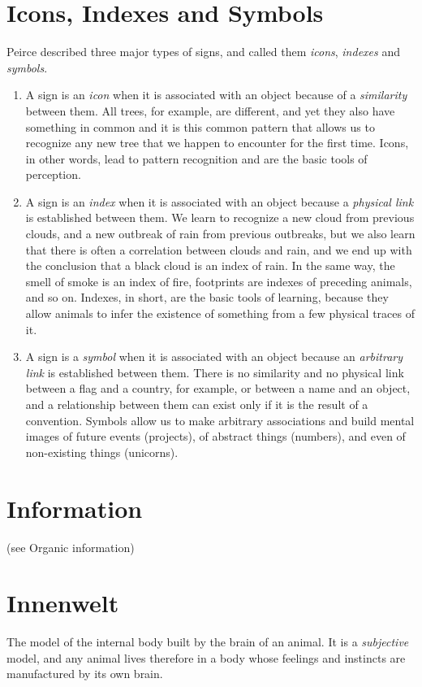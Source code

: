 \documentclass[12pt]{article}
\begin{document}
\section{Icons, Indexes and Symbols}
Peirce described three major types of signs, and called them \textit{icons}, \textit{indexes} and \textit{symbols}.
\begin{enumerate}
\item A sign is an \textit{icon} when it is associated with an object because of a \textit{similarity} between them. All trees, for example, are different, and yet they also have something in common and it is this common pattern that allows us to recognize any new tree that we happen to encounter for the first time. Icons, in other words, lead to pattern recognition and are the basic tools of perception. 

\item A sign is an \textit{index} when it is associated with an object because a \textit{physical link} is established between them. We learn to recognize a new cloud from previous clouds, and a new outbreak of rain from previous outbreaks, but we also learn that there is often a correlation between clouds and rain, and we end up with the conclusion that a black cloud is an index of rain. In the same way, the smell of smoke is an index of fire, footprints are indexes of preceding animals, and so on. Indexes, in short, are the basic tools of learning, because they allow animals to infer the existence of something from a few physical traces of it.

\item A sign is a \textit{symbol} when it is associated with an object because an \textit{arbitrary link} is established between them. There is no similarity and no physical link between a flag and a country, for example, or between a name and an object, and a relationship between them can exist only if it is the result of a convention. Symbols allow us to make arbitrary associations and build mental images of future events (projects), of abstract things (numbers), and even of non-existing things (unicorns). 
\end{enumerate}


\section{Information} (see Organic information) 


\section{Innenwelt}
The model of the internal body built by the brain of an animal. It is a \textit{subjective} model, and any animal lives therefore in a body whose feelings and instincts are manufactured by its own brain.
\end{document}
